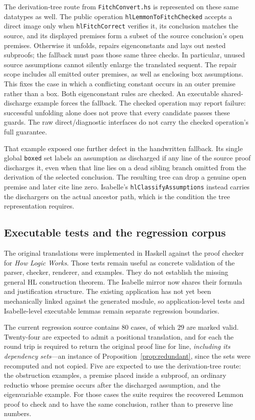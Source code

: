 \documentclass[11pt]{article}
\theoremstyle{plain}
\theoremstyle{definition}
\theoremstyle{remark}
\begin{document}
The derivation-tree route from \verb|FitchConvert.hs| is represented on these
same datatypes as well.  The public operation
\verb|hlLemmonToFitchChecked| accepts a direct image only when
\verb|hlFitchCorrect| verifies it, its conclusion matches the source, and its
displayed premises form a subset of the source conclusion's open premises.
Otherwise it unfolds, repairs eigenconstants and lays out nested subproofs;
the fallback must pass those same three checks. In particular, unused source
assumptions cannot silently enlarge the translated sequent.
The repair scope includes all emitted outer premises, as well as enclosing
box assumptions. This fixes the case in which a conflicting constant occurs
in an outer premise rather than a box. Both eigenconstant rules are checked.
An executable shared-discharge example forces the fallback. The checked
operation may report failure: successful unfolding alone does not prove that
every candidate passes these guards. The raw direct/diagnostic interfaces do
not carry the checked operation's full guarantee.

That example exposed one further defect in the handwritten fallback.  Its
single global \verb|boxed| set labels an assumption as discharged if any line
of the source proof discharges it, even when that line lies on a dead sibling
branch omitted from the derivation of the selected conclusion.  The resulting
tree can drop a genuine open premise and later cite line zero.  Isabelle's
\verb|hlClassifyAssumptions| instead carries the dischargers on the actual
ancestor path, which is the condition the tree representation requires.

\subsection{Executable tests and the regression corpus}

The original translations were implemented in Haskell against the proof
checker for \emph{How Logic Works}. Those tests remain useful as concrete
validation of the parser, checker, renderer, and examples. They do not
establish the missing general HL construction theorem. The
Isabelle mirror now shares their formula and justification structure. The
existing application has not yet been mechanically linked against the
generated module, so application-level tests and Isabelle-level executable
lemmas remain separate regression boundaries.

The current regression source contains $80$ cases, of which $29$ are marked
valid. Twenty-four are expected to admit a positional translation, and for
each the round trip is required to return the original proof line for line,
\emph{including its dependency sets}---an instance of
Proposition~\ref{prop:redundant}, since the sets were recomputed and not
copied. Five are expected to use the derivation-tree route: the obstruction
examples, a premise placed inside a subproof, an ordinary reductio whose
premise occurs after the discharged assumption, and the eigenvariable example.
For those cases the suite requires the recovered Lemmon proof to check and to
have the same conclusion, rather than to preserve line numbers.
\end{document}
